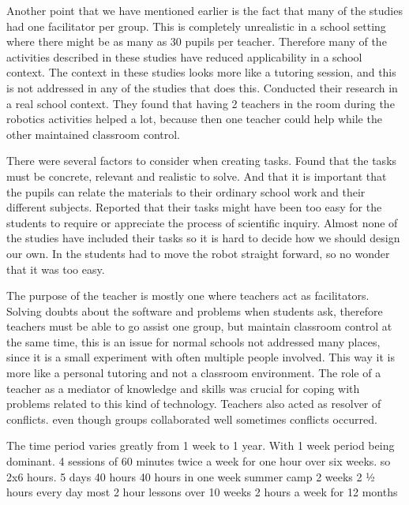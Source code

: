 \bigskip\noindent
Another point that we have mentioned earlier is the fact that many of the studies had one facilitator per group. This is completely unrealistic in a school setting where there might be as many as 30 pupils per teacher. Therefore many of the activities described in these studies have reduced applicability in a school context. The context in these studies looks more like a tutoring session, and this is not addressed in any of the studies that does this. \cite{lindh2007does} Conducted their research in a real school context. They found that having 2 teachers in the room during the robotics activities helped a lot, because then one teacher could help while the other maintained classroom control.

\bigskip\noindent
There were several factors to consider when creating tasks. \cite{lindh2007does} Found that the tasks must be concrete, relevant and realistic  to solve. And that it is important that the pupils can relate the materials to their ordinary school work and their different subjects. \cite{williams2007acquisition} Reported that their tasks might have been too easy for the students to require or appreciate the process of  scientific inquiry. Almost none of the studies have included their tasks so it is hard to decide how we should design our own. In \cite{williams2007acquisition} the students had to move the robot straight forward, so no wonder that it was too easy.

\bigskip\noindent
The purpose of the teacher is mostly one where teachers act as facilitators. Solving doubts about the software and problems when students ask, therefore teachers must be able to go assist one group, but maintain classroom control at the same time, this is an issue for normal schools not addressed many places, since it is a small experiment with often multiple people involved. This way it is more like a personal tutoring and not a classroom environment. 
\cite{lindh2007does} The role of a teacher as a mediator of knowledge and skills was crucial for coping with problems related to this kind of technology. 
\cite{lindh2007does} Teachers also acted as resolver of conflicts. even though groups collaborated well sometimes conflicts occurred. 

\bigskip\noindent
The time period varies greatly from 1 week to 1 year. With 1 week period being dominant.
\cite{mitnik2009collaborative} 4 sessions of 60 minutes
\cite{barker2007robotics} twice a week for one hour over six weeks. so 2x6 hours. 
\cite{nugent2008effect} 5 days 40 hours
\cite{nugent2009use} 40 hours in one week summer camp
\cite{williams2007acquisition} 2 weeks 2 ½ hours every day
\cite{norton2004using} most 2 hour lessons over 10 weeks
\cite{lindh2007does} 2 hours a week for 12 months

